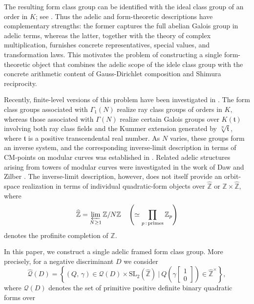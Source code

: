 \documentclass[reqno,11pt]{article}
\theoremstyle{plain} %
\theoremstyle{definition} %
\begin{document}
The resulting form class group can be identified with the ideal class group of an
order in $K$; see \cite{Cox}. 
Thus the adelic and form-theoretic 
descriptions have complementary strengths: the former captures 
the full abelian Galois group in adelic terms, 
whereas the latter, together with the theory of
complex multiplication, furnishes concrete representatives, 
special values, and transformation laws. 
This motivates the problem of constructing a single form-theoretic object that combines the adelic scope of the idele class group with the
concrete arithmetic content of Gauss-Dirichlet composition and Shimura reciprocity. 
\par
Recently, finite-level versions of this problem have been investigated in 
\cite{E-K-S, J-K-S-Y}. The form class groups associated with $\Gamma_1(N)$ realize ray class groups of 
orders in $K$, whereas those associated with $\Gamma(N)$ realize certain Galois groups over $K(\mathfrak{t})$ involving both ray class fields and the Kummer extension generated by $\sqrt[N]{\mathfrak{t}}$, where $\mathfrak{t}$ is a positive transcendental real number. 
As $N$ varies, these groups form an inverse system,
and the corresponding inverse-limit description 
in terms of CM-points on modular curves was established in \cite{J-K-S}. 
Related adelic structures arising from towers of modular curves
were investigated in the work of Daw and Zilber \cite{D-Z}.
The inverse-limit description, however, 
does not itself provide an orbit-space
realization in terms of individual quadratic-form objects
over $\widehat{\mathbb{Z}}$ or $\mathbb{Z}\times\widehat{\mathbb{Z}}$,
where
\begin{equation*}
\widehat{\mathbb{Z}}=\varprojlim_{N\geq1}\mathbb{Z}/N\mathbb{Z}
\quad\left(\simeq\prod_{p\,:\,\text{primes}}
\mathbb{Z}_p\right)
\end{equation*}
denotes the profinite 
completion of $\mathbb{Z}$.
\par
In this paper, 
we construct a single adelic framed form class group. More precisely, for a negative discriminant $D$
we consider
\begin{equation*}
\widehat{\mathcal{Q}}(D)=
\left\{(Q,\,\gamma)\in\mathcal{Q}(D)\times
\mathrm{SL}_2(\widehat{\mathbb{Z}})~|~
Q\left(\gamma\begin{bmatrix}1\\0\end{bmatrix}\right)\in\widehat{\mathbb{Z}}^{\times}\right\},
\end{equation*}
where $\mathcal{Q}(D)$ denotes the set of primitive positive definite binary quadratic forms over
\end{document}
